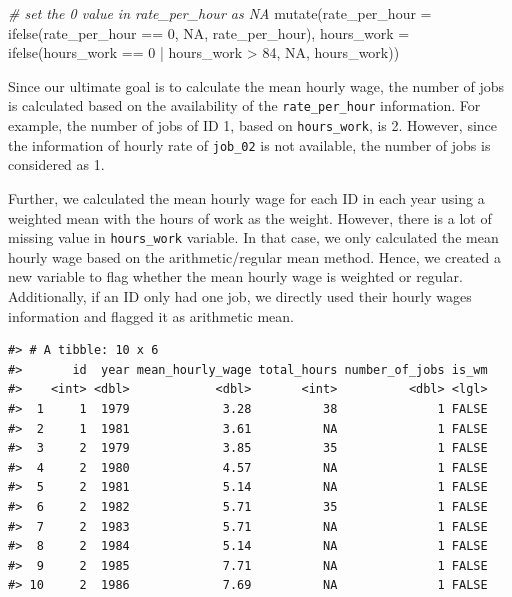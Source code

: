 \documentclass[12pt]{article}
\newenvironment{Shaded}{\begin{snugshade}}{\end{snugshade}}
\newcommand{\AttributeTok}[1]{\textcolor[rgb]{0.77,0.63,0.00}{#1}}
\newcommand{\CommentTok}[1]{\textcolor[rgb]{0.56,0.35,0.01}{\textit{#1}}}
\newcommand{\ConstantTok}[1]{\textcolor[rgb]{0.00,0.00,0.00}{#1}}
\newcommand{\DecValTok}[1]{\textcolor[rgb]{0.00,0.00,0.81}{#1}}
\newcommand{\FunctionTok}[1]{\textcolor[rgb]{0.00,0.00,0.00}{#1}}
\newcommand{\NormalTok}[1]{#1}
\newcommand{\SpecialCharTok}[1]{\textcolor[rgb]{0.00,0.00,0.00}{#1}}
\begin{document}
\begin{Shaded}
\begin{Highlighting}[]
  \CommentTok{\# set the 0 value in rate\_per\_hour as NA}
  \FunctionTok{mutate}\NormalTok{(}\AttributeTok{rate\_per\_hour =} \FunctionTok{ifelse}\NormalTok{(rate\_per\_hour }\SpecialCharTok{==} \DecValTok{0}\NormalTok{, }\ConstantTok{NA}\NormalTok{,}
\NormalTok{                                rate\_per\_hour),}
         \AttributeTok{hours\_work =} \FunctionTok{ifelse}\NormalTok{(hours\_work }\SpecialCharTok{==} \DecValTok{0} \SpecialCharTok{|}\NormalTok{ hours\_work }\SpecialCharTok{\textgreater{}} \DecValTok{84}\NormalTok{, }\ConstantTok{NA}\NormalTok{, hours\_work))}
\end{Highlighting}
\end{Shaded}

Since our ultimate goal is to calculate the mean hourly wage, the number of jobs is calculated based on the availability of the \texttt{rate\_per\_hour} information. For example, the number of jobs of ID 1, based on \texttt{hours\_work}, is 2. However, since the information of hourly rate of \texttt{job\_02} is not available, the number of jobs is considered as 1.

Further, we calculated the mean hourly wage for each ID in each year using a weighted mean with the hours of work as the weight. However, there is a lot of missing value in \texttt{hours\_work} variable. In that case, we only calculated the mean hourly wage based on the arithmetic/regular mean method. Hence, we created a new variable to flag whether the mean hourly wage is weighted or regular. Additionally, if an ID only had one job, we directly used their hourly wages information and flagged it as arithmetic mean.

\begin{verbatim}
#> # A tibble: 10 x 6
#>       id  year mean_hourly_wage total_hours number_of_jobs is_wm
#>    <int> <dbl>            <dbl>       <int>          <dbl> <lgl>
#>  1     1  1979             3.28          38              1 FALSE
#>  2     1  1981             3.61          NA              1 FALSE
#>  3     2  1979             3.85          35              1 FALSE
#>  4     2  1980             4.57          NA              1 FALSE
#>  5     2  1981             5.14          NA              1 FALSE
#>  6     2  1982             5.71          35              1 FALSE
#>  7     2  1983             5.71          NA              1 FALSE
#>  8     2  1984             5.14          NA              1 FALSE
#>  9     2  1985             7.71          NA              1 FALSE
#> 10     2  1986             7.69          NA              1 FALSE
\end{verbatim}
\end{document}
